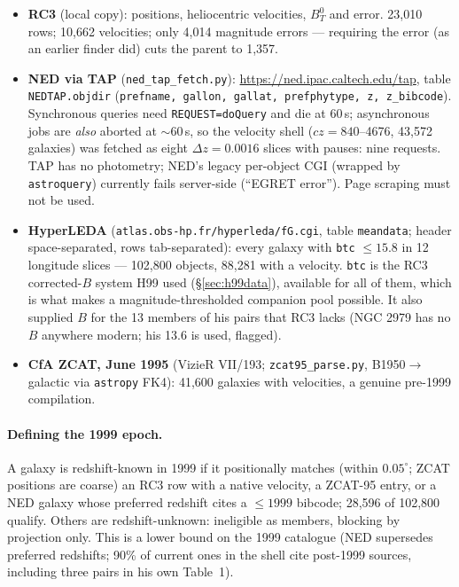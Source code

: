\documentclass[11pt]{article}
\begin{document}
\begin{itemize}\itemsep3pt
  \item \textbf{RC3} (local copy): positions, heliocentric velocities,
        $B_T^0$ and error. 23,010 rows; 10,662 velocities; only 4,014
        magnitude errors --- requiring the error (as an earlier finder did)
        cuts the parent to 1,357.
  \item \textbf{NED via TAP} (\texttt{ned\_tap\_fetch.py}):
        \url{https://ned.ipac.caltech.edu/tap}, table \texttt{NEDTAP.objdir}
        (\texttt{prefname, gallon, gallat, prefphytype, z, z\_bibcode}).
        Synchronous queries need \texttt{REQUEST=doQuery} and die at 60\,s;
        asynchronous jobs are \emph{also} aborted at $\sim$60\,s, so the
        velocity shell ($cz = 840$--4676, 43,572 galaxies) was fetched as
        eight $\Delta z = 0.0016$ slices with pauses: nine requests. TAP has
        no photometry; NED's legacy per-object CGI (wrapped by
        \texttt{astroquery}) currently fails server-side (``EGRET error'').
        Page scraping must not be used.
  \item \textbf{HyperLEDA} (\texttt{atlas.obs-hp.fr/hyperleda/fG.cgi},
        table \texttt{meandata}; header space-separated, rows tab-separated):
        every galaxy with \texttt{btc} $\le 15.8$ in 12 longitude slices ---
        102,800 objects, 88,281 with a velocity. \texttt{btc} is the RC3
        corrected-$B$ system H99 used (\S\ref{sec:h99data}), available for all
        of them, which is what makes a magnitude-thresholded companion pool
        possible. It also supplied $B$ for the 13 members of his pairs that
        RC3 lacks (NGC 2979 has no $B$ anywhere modern; his 13.6 is used,
        flagged).
  \item \textbf{CfA ZCAT, June 1995} (VizieR VII/193; \texttt{zcat95\_parse.py},
        B1950$\to$galactic via \texttt{astropy} FK4): 41,600 galaxies with
        velocities, a genuine pre-1999 compilation.
\end{itemize}

\paragraph{Defining the 1999 epoch.} A galaxy is redshift-known in 1999 if it
positionally matches (within $0.05^\circ$; ZCAT positions are coarse) an RC3
row with a native velocity, a ZCAT-95 entry, or a NED galaxy whose preferred
redshift cites a $\le 1999$ bibcode; 28,596 of 102,800 qualify. Others are
redshift-unknown: ineligible as members, blocking by projection only. This is
a lower bound on the 1999 catalogue (NED supersedes preferred redshifts; 90\%
of current ones in the shell cite post-1999 sources, including three pairs in
his own Table~1).
\end{document}
